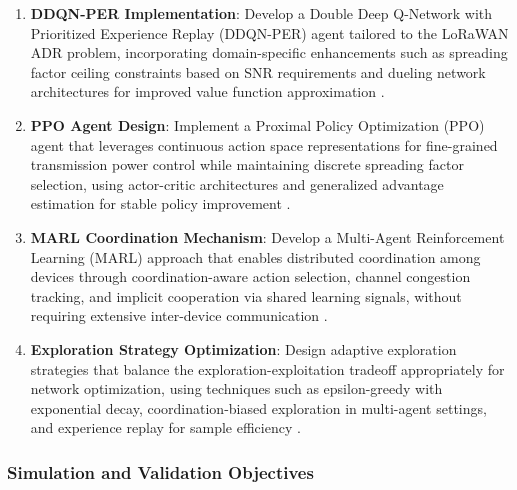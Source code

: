 \documentclass[12pt,a4paper]{article}
\begin{document}
\begin{enumerate}
    \item \textbf{DDQN-PER Implementation}: Develop a Double Deep Q-Network with Prioritized Experience Replay (DDQN-PER) agent tailored to the LoRaWAN ADR problem, incorporating domain-specific enhancements such as spreading factor ceiling constraints based on SNR requirements and dueling network architectures for improved value function approximation \cite{van2016deep, schaul2015prioritized}.
    
    \item \textbf{PPO Agent Design}: Implement a Proximal Policy Optimization (PPO) agent that leverages continuous action space representations for fine-grained transmission power control while maintaining discrete spreading factor selection, using actor-critic architectures and generalized advantage estimation for stable policy improvement \cite{schulman2017proximal}.
    
    \item \textbf{MARL Coordination Mechanism}: Develop a Multi-Agent Reinforcement Learning (MARL) approach that enables distributed coordination among devices through coordination-aware action selection, channel congestion tracking, and implicit cooperation via shared learning signals, without requiring extensive inter-device communication \cite{busoniu2008comprehensive}.
    
    \item \textbf{Exploration Strategy Optimization}: Design adaptive exploration strategies that balance the exploration-exploitation tradeoff appropriately for network optimization, using techniques such as epsilon-greedy with exponential decay, coordination-biased exploration in multi-agent settings, and experience replay for sample efficiency \cite{mnih2015human}.
\end{enumerate}

\subsubsection{Simulation and Validation Objectives}
\end{document}

